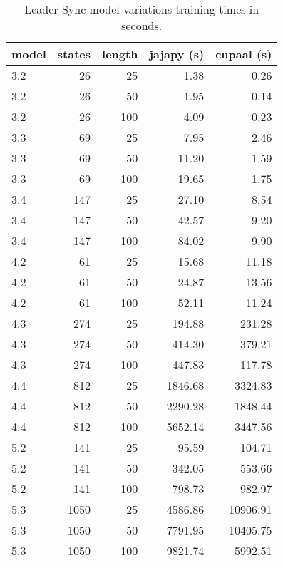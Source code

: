 \begin{table}[htb!]
    \centering
    \caption{Leader Sync model variations training times in seconds.}
    \label{tab:leader_results}
    \begin{tabular}{lrrrr}
        \toprule
        model & states & length & jajapy (s) & cupaal (s) \\
        \midrule
        3.2   & 26     & 25     & 1.38       & 0.26       \\
        3.2   & 26     & 50     & 1.95       & 0.14       \\
        3.2   & 26     & 100    & 4.09       & 0.23       \\
        3.3   & 69     & 25     & 7.95       & 2.46       \\
        3.3   & 69     & 50     & 11.20      & 1.59       \\
        3.3   & 69     & 100    & 19.65      & 1.75       \\
        3.4   & 147    & 25     & 27.10      & 8.54       \\
        3.4   & 147    & 50     & 42.57      & 9.20       \\
        3.4   & 147    & 100    & 84.02      & 9.90       \\
        4.2   & 61     & 25     & 15.68      & 11.18      \\
        4.2   & 61     & 50     & 24.87      & 13.56      \\
        4.2   & 61     & 100    & 52.11      & 11.24      \\
        4.3   & 274    & 25     & 194.88     & 231.28     \\
        4.3   & 274    & 50     & 414.30     & 379.21     \\
        4.3   & 274    & 100    & 447.83     & 117.78     \\
        4.4   & 812    & 25     & 1846.68    & 3324.83    \\
        4.4   & 812    & 50     & 2290.28    & 1848.44    \\
        4.4   & 812    & 100    & 5652.14    & 3447.56    \\
        5.2   & 141    & 25     & 95.59      & 104.71     \\
        5.2   & 141    & 50     & 342.05     & 553.66     \\
        5.2   & 141    & 100    & 798.73     & 982.97     \\
        5.3   & 1050   & 25     & 4586.86    & 10906.91   \\
        5.3   & 1050   & 50     & 7791.95    & 10405.75   \\
        5.3   & 1050   & 100    & 9821.74    & 5992.51    \\
        \bottomrule
    \end{tabular}
\end{table}


